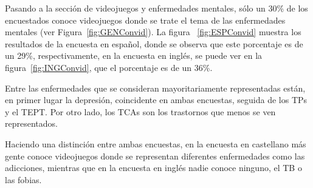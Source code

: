\documentclass[12pt, a4paper,twoside,titlepage]{book}
\newcommand{\comm}[1]{\todo[linecolor=yellow]{\textsf{#1}}}
\newcommand{\commin}[1]{\todo[inline,linecolor=yellow]{\textsf{#1}}}
\begin{document}

 Pasando a la sección de videojuegos y enfermedades mentales, sólo un 30\% de los encuestados conoce videojuegos donde se trate el tema de las enfermedades mentales (ver Figura~\ref{fig:GENConvid}). La figura ~\ref{fig:ESPConvid} muestra los resultados de la encuesta en español, donde se observa que este porcentaje es de un 29\%, respectivamente, en la encuesta en inglés, se puede ver en la figura~\ref{fig:INGConvid}, que el porcentaje es de un 36\%. 



Entre las enfermedades que se consideran mayoritariamente representadas están, en primer lugar la depresión, coincidente en ambas encuestas, seguida de los TPs y el TEPT. Por otro lado, los TCAs son los trastornos que menos se ven representados.  

Haciendo una distinción entre ambas encuestas, en la encuesta en castellano más gente conoce videojuegos donde se representan diferentes enfermedades como las adicciones, mientras que en la encuesta en inglés nadie conoce ninguno, el TB o las fobias. 
\end{document}

